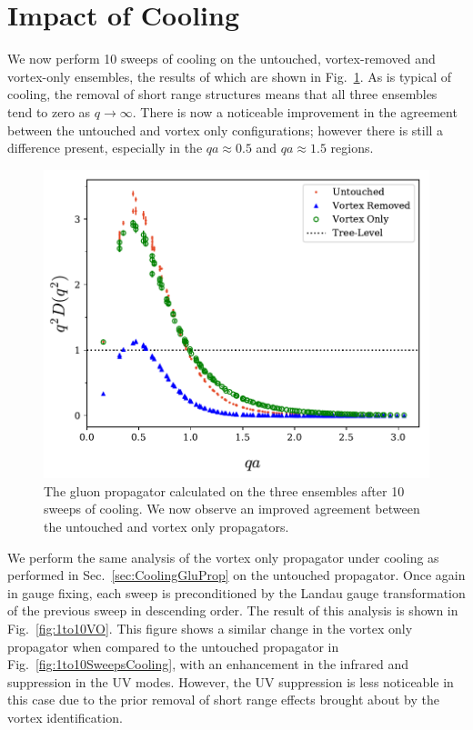 \section{Impact of Cooling}
We now perform 10 sweeps of cooling on the untouched, vortex-removed and vortex-only ensembles, the results of which are shown in Fig.~\ref{fig:10SweepsCooling}. As is typical of cooling, the removal of short range structures means that all three ensembles tend to zero as $q\rightarrow\infty$. There is now a noticeable improvement in the agreement between the untouched and vortex only configurations; however there is still a difference present, especially in the $qa\approx0.5$ and $qa\approx1.5$ regions.\\
%
\begin{figure}[H]
\centering
\includegraphics[width=\linewidth]{./ScalarGluComp_q2_10sweepsAll.pdf}
\caption[The gluon propagator calculated on the three ensembles after 10 sweeps of cooling.]{\label{fig:10SweepsCooling}The gluon propagator calculated on the three ensembles after 10 sweeps of cooling. We now observe an improved agreement between the untouched and vortex only propagators.}
\end{figure}  
%

We perform the same analysis of the vortex only propagator under cooling as performed in Sec.~\ref{sec:CoolingGluProp} on the untouched propagator. Once again in gauge fixing, each sweep is preconditioned by the Landau gauge transformation of the previous sweep in descending order. The result of this analysis is shown in Fig.~\ref{fig:1to10VO}. This figure shows a similar change in the vortex only propagator when compared to the untouched propagator in Fig.~\ref{fig:1to10SweepsCooling}, with an enhancement in the infrared and suppression in the UV modes. However, the UV suppression is less noticeable in this case due to the prior removal of short range effects brought about by the vortex identification.\\

